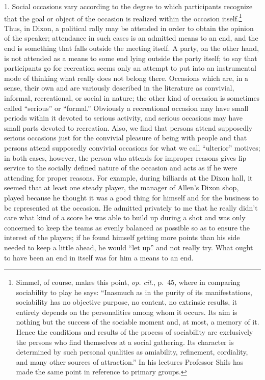 \documentclass[openany,nobib]{tufte-book}
\begin{document}
1. Social occasions vary according to the degree to which participants
recognize that the goal or object of the occasion is realized within the
occasion itself.\footnote{Simmel, of course, makes this point, \emph{op.
  cit}., p.~45, where in comparing sociability to play he says:
  ``Inasmuch as in the purity of its manifestations, sociability has no
  objective purpose, no content, no extrinsic results, it entirely
  depends on the personalities among whom it occurs. Its aim is nothing
  but the success of the sociable moment and, at most, a memory of it.
  Hence the conditions and results of the process of sociability are
  exclusively the persons who find themselves at a social gathering. Its
  character is determined by such personal qualities as amiability,
  refinement, cordiality, and many other sources of attraction.'' In his
  lectures Professor Shils has made the same point in reference to
  primary groups.} Thus, in Dixon, a political rally may be attended in
order to obtain the opinion of the speaker; attendance in such cases is
an admitted means to an end, and the end is something that falls outside
the meeting itself. A party, on the other hand, is not attended as a
means to some end lying outside the party itself; to say that
participants go for recreation seems only an attempt to put into an
instrumental mode of thinking what really does not belong there.
Occasions which are, in a sense, their own and are variously described
in the literature as convivial, informal, recreational, or social in
nature; the other kind of occasion is sometimes called ``serious'' or
``formal.'' Obviously a recreational occasion may have small periods
within it devoted to serious activity, and serious occasions may have
small parts devoted to recreation. Also, we find that persons attend
supposedly serious occasions just for the convivial pleasure of being
with people and that persons attend supposedly convivial occasions for
what we call ``ulterior'' motives; in both cases, however, the person
who attends for improper reasons gives lip service to the socially
defined nature of the occasion and acts as if he were attending for
proper reasons. For example, during billiards at the Dixon hall, it
seemed that at least one steady player, the manager of Allen's Dixon
shop, played because he thought it was a good thing for himself and for
the business to be represented at the occasion. He admitted privately to
me that he really didn't care what kind of a score he was able to build
up during a shot and was only concerned to keep the teams as evenly
balanced as possible so as to ensure the interest of the players; if he
found himself getting more points than his side needed to keep a little
ahead, he would ``let up'' and not really try. What ought to have been
an end in itself was for him a means to an end.
\end{document}
